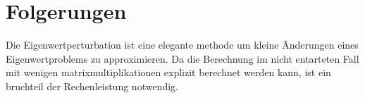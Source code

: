 %
%
%
\section{Folgerungen
\label{ew:section:folgerungen}}

Die Eigenwertperturbation ist eine elegante methode um kleine Änderungen eines Eigenwertproblems zu approximieren.
Da die Berechnung im nicht entarteten Fall mit wenigen matrixmultiplikationen explizit berechnet werden kann, ist ein bruchteil der Rechenleistung notwendig.


